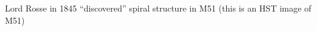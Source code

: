 \documentclass[letterpaper,landscape]{slides}
\begin{document}
\begin{slide}
\begin{center}
\vskip -0.1in
\end{center}

\begin{center}
\vskip -0.3in
Lord Rosse in 1845 ``discovered'' spiral structure in M51 (this is an HST image of M51)

\end{center}

\vfill
\end{slide}

\end{document}
